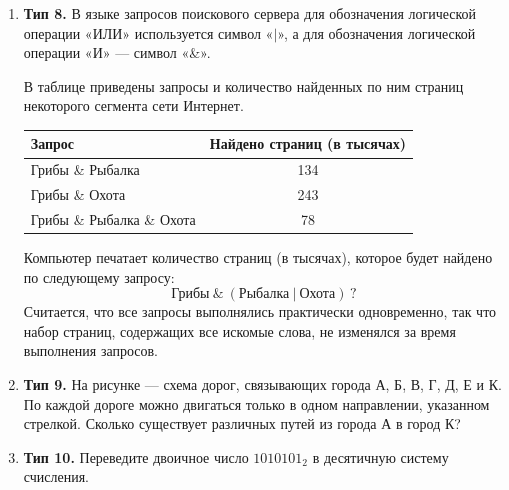 \documentclass[a4paper]{article}
\begin{document}
\begin{enumerate}[label=\textbf{Задача \arabic*.}, leftmargin=*, itemsep=10mm]
\item \textbf{Тип 8.}
В языке запросов поискового сервера для обозначения логической операции
«ИЛИ» используется символ «$|$», а для обозначения логической операции
«И» — символ «\&».

В таблице приведены запросы и количество найденных по ним страниц
некоторого сегмента сети Интернет.

\bigskip
\begin{center}
\begin{tabular}{lc}
\toprule
Запрос & Найдено страниц (в тысячах) \\
\midrule
Грибы \& Рыбалка           & 134 \\
Грибы \& Охота              & 243 \\
Грибы \& Рыбалка \& Охота   & 78  \\
\bottomrule
\end{tabular}
\end{center}
\bigskip

Компьютер печатает количество страниц (в тысячах), которое будет найдено
по следующему запросу:
\[
  \text{Грибы}\ \&\ (\text{Рыбалка}\ |\ \text{Охота})\,?
\]
Считается, что все запросы выполнялись практически одновременно, так что
набор страниц, содержащих все искомые слова, не изменялся за время
выполнения запросов.

\item \textbf{Тип 9.}
На рисунке — схема дорог, связывающих города А, Б, В, Г, Д, Е и К.
По каждой дороге можно двигаться только в одном направлении, указанном
стрелкой. Сколько существует различных путей из города А в город К?

\bigskip
\begin{center}
\end{center}

\item \textbf{Тип 10.}
Переведите двоичное число $1010101_2$ в десятичную систему счисления.

\end{enumerate}
\end{document}
